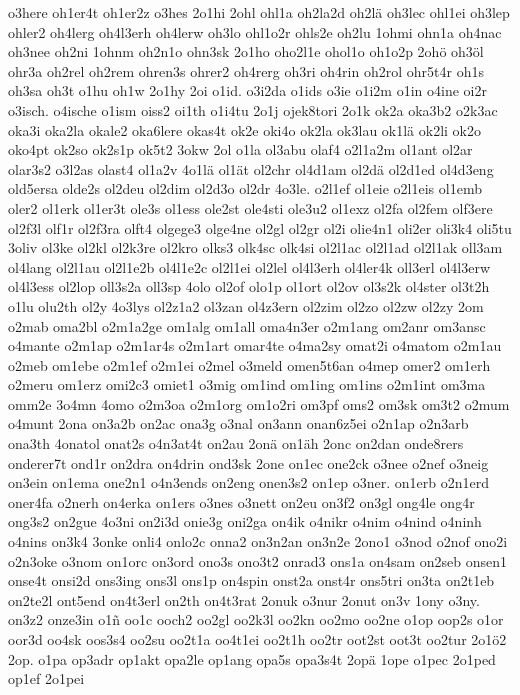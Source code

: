 {o3here
oh1er4t
oh1er2z
o3hes
2o1hi
2ohl
ohl1a
oh2la2d
oh2lä
oh3lec
ohl1ei
oh3lep
ohler2
oh4lerg
oh4l3erh
oh4lerw
oh3lo
ohl1o2r
ohls2e
oh2lu
1ohmi
ohn1a
oh4nac
oh3nee
oh2ni
1ohnm
oh2n1o
ohn3sk
2o1ho
oho2l1e
ohol1o
oh1o2p
2ohö
oh3öl
ohr3a
oh2rel
oh2rem
ohren3s
ohrer2
oh4rerg
oh3ri
oh4rin
oh2rol
ohr5t4r
oh1s
oh3sa
oh3t
o1hu
oh1w
2o1hy
2oi
o1id.
o3i2da
o1ids
o3ie
o1i2m
o1in
o4ine
oi2r
o3isch.
o4ische
o1ism
oiss2
oi1th
o1i4tu
2o1j
ojek8tori
2o1k
ok2a
oka3b2
o2k3ac
oka3i
oka2la
okale2
oka6lere
okas4t
ok2e
oki4o
ok2la
ok3lau
ok1lä
ok2li
ok2o
oko4pt
ok2so
ok2s1p
ok5t2
3okw
2ol
o1la
ol3abu
olaf4
o2l1a2m
ol1ant
ol2ar
olar3s2
o3l2as
olast4
ol1a2v
4o1lä
ol1ät
ol2chr
ol4d1am
ol2dä
ol2d1ed
ol4d3eng
old5ersa
olde2s
ol2deu
ol2dim
ol2d3o
ol2dr
4o3le.
o2l1ef
ol1eie
o2l1eis
ol1emb
oler2
ol1erk
ol1er3t
ole3s
ol1ess
ole2st
ole4sti
ole3u2
ol1exz
ol2fa
ol2fem
olf3ere
ol2f3l
olf1r
ol2f3ra
olft4
olgege3
olge4ne
ol2gl
ol2gr
ol2i
olie4n1
oli2er
oli3k4
oli5tu
3oliv
ol3ke
ol2kl
ol2k3re
ol2kro
olks3
olk4sc
olk4si
ol2l1ac
ol2l1ad
ol2l1ak
oll3am
ol4lang
ol2l1au
ol2l1e2b
ol4l1e2c
ol2l1ei
ol2lel
ol4l3erh
ol4ler4k
oll3erl
ol4l3erw
ol4l3ess
ol2lop
oll3s2a
oll3sp
4olo
ol2of
olo1p
ol1ort
ol2ov
ol3s2k
ol4ster
ol3t2h
o1lu
olu2th
ol2y
4o3lys
ol2z1a2
ol3zan
ol4z3ern
ol2zim
ol2zo
ol2zw
ol2zy
2om
o2mab
oma2bl
o2m1a2ge
om1alg
om1all
oma4n3er
o2m1ang
om2anr
om3ansc
o4mante
o2m1ap
o2m1ar4s
o2m1art
omar4te
o4ma2sy
omat2i
o4matom
o2m1au
o2meb
om1ebe
o2m1ef
o2m1ei
o2mel
o3meld
omen5t6an
o4mep
omer2
om1erh
o2meru
om1erz
omi2c3
omiet1
o3mig
om1ind
om1ing
om1ins
o2m1int
om3ma
omm2e
3o4mn
4omo
o2m3oa
o2m1org
om1o2ri
om3pf
oms2
om3sk
om3t2
o2mum
o4munt
2ona
on3a2b
on2ac
ona3g
o3nal
on3ann
onan6z5ei
o2n1ap
o2n3arb
ona3th
4onatol
onat2s
o4n3at4t
on2au
2onä
on1äh
2onc
on2dan
onde8rers
onderer7t
ond1r
on2dra
on4drin
ond3sk
2one
on1ec
one2ck
o3nee
o2nef
o3neig
on3ein
on1ema
one2n1
o4n3ends
on2eng
onen3s2
on1ep
o3ner.
on1erb
o2n1erd
oner4fa
o2nerh
on4erka
on1ers
o3nes
o3nett
on2eu
on3f2
on3gl
ong4le
ong4r
ong3s2
on2gue
4o3ni
on2i3d
onie3g
oni2ga
on4ik
o4nikr
o4nim
o4nind
o4ninh
o4nins
on3k4
3onke
onli4
onlo2c
onna2
on3n2an
on3n2e
2ono1
o3nod
o2nof
ono2i
o2n3oke
o3nom
on1orc
on3ord
ono3s
ono3t2
onrad3
ons1a
on4sam
on2seb
onsen1
onse4t
onsi2d
ons3ing
ons3l
ons1p
on4spin
onst2a
onst4r
ons5tri
on3ta
on2t1eb
on2te2l
ont5end
on4t3erl
on2th
on4t3rat
2onuk
o3nur
2onut
on3v
1ony
o3ny.
on3z2
onze3in
o1ñ
oo1c
ooch2
oo2gl
oo2k3l
oo2kn
oo2mo
oo2ne
o1op
oop2s
o1or
oor3d
oo4sk
oos3s4
oo2su
oo2t1a
oo4t1ei
oo2t1h
oo2tr
oot2st
oot3t
oo2tur
2o1ö2
2op.
o1pa
op3adr
op1akt
opa2le
op1ang
opa5s
opa3s4t
2opä
1ope
o1pec
2o1ped
op1ef
2o1pei
}
